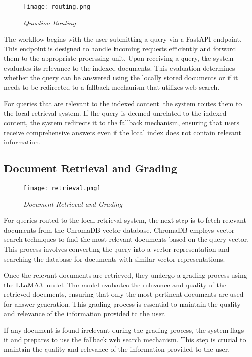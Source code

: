 \begin{figure}[H]
    \centering
    \texttt{[image: routing.png]}
    \caption{
        \it{Question Routing}
    }
\end{figure}

The workflow begins with the user submitting a query via a FastAPI endpoint. This endpoint is designed to handle incoming requests efficiently and forward them to the appropriate processing unit. Upon receiving a query, the system evaluates its relevance to the indexed documents. This evaluation determines whether the query can be answered using the locally stored documents or if it needs to be redirected to a fallback mechanism that utilizes web search.

For queries that are relevant to the indexed content, the system routes them to the local retrieval system. If the query is deemed unrelated to the indexed content, the system redirects it to the fallback mechanism, ensuring that users receive comprehensive answers even if the local index does not contain relevant information.

\subsection{Document Retrieval and Grading}

\begin{figure}[H]
    \centering
    \texttt{[image: retrieval.png]}
    \caption{
        \it{Document Retrieval and Grading}
    }
\end{figure}

For queries routed to the local retrieval system, the next step is to fetch relevant documents from the ChromaDB vector database. ChromaDB employs vector search techniques to find the most relevant documents based on the query vector. This process involves converting the query into a vector representation and searching the database for documents with similar vector representations.

Once the relevant documents are retrieved, they undergo a grading process using the LLaMA3 model. The model evaluates the relevance and quality of the retrieved documents, ensuring that only the most pertinent documents are used for answer generation. This grading process is essential to maintain the quality and relevance of the information provided to the user.

If any document is found irrelevant during the grading process, the system flags it and prepares to use the fallback web search mechanism. This step is crucial to maintain the quality and relevance of the information provided to the user.


